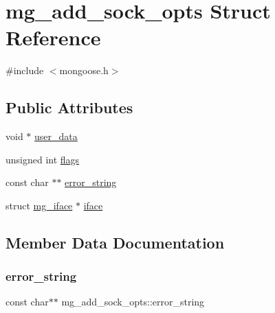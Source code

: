 \hypertarget{structmg__add__sock__opts}{}\section{mg\+\_\+add\+\_\+sock\+\_\+opts Struct Reference}
\label{structmg__add__sock__opts}


{\ttfamily \#include $<$mongoose.\+h$>$}

\subsection*{Public Attributes}
\begin{DoxyCompactItemize}
\item 
void $\ast$ \hyperlink{structmg__add__sock__opts_af927a96c42e76f43592b510eca4e1f8e_af927a96c42e76f43592b510eca4e1f8e}{user\+\_\+data}
\item 
unsigned int \hyperlink{structmg__add__sock__opts_ac836b917617be7c0a38e6a322cdf9cff_ac836b917617be7c0a38e6a322cdf9cff}{flags}
\item 
const char $\ast$$\ast$ \hyperlink{structmg__add__sock__opts_a13c0a3d7dc05ad3873a03a7236735a50_a13c0a3d7dc05ad3873a03a7236735a50}{error\+\_\+string}
\item 
struct \hyperlink{structmg__iface}{mg\+\_\+iface} $\ast$ \hyperlink{structmg__add__sock__opts_a3d5516f6481c9a317b4708ec370a9b43_a3d5516f6481c9a317b4708ec370a9b43}{iface}
\end{DoxyCompactItemize}


\subsection{Member Data Documentation}
\mbox{\label{structmg__add__sock__opts_a13c0a3d7dc05ad3873a03a7236735a50_a13c0a3d7dc05ad3873a03a7236735a50}} 
\subsubsection{\texorpdfstring{error\+\_\+string}{error\_string}}
{\footnotesize\ttfamily const char$\ast$$\ast$ mg\+\_\+add\+\_\+sock\+\_\+opts\+::error\+\_\+string}



